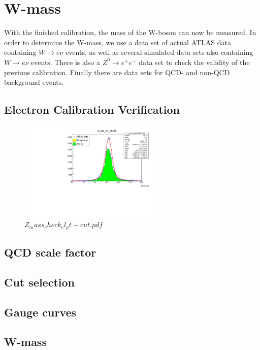 \section{W-mass}
\label{sec:w-mass}
With the finished calibration, the mass of the W-boson can now be measured. 
In order to determine the W-mass, we use a data set of actual ATLAS data containing $W \rightarrow e\nu$ events,
as well as several simulated data sets also containing $W \rightarrow e\nu$ events. 
There is also a $Z^0 \rightarrow e^+e^-$ data set to check the validity of the previous calibration. Finally there are data sets for QCD- and non-QCD background events.

\subsection{Electron Calibration Verification}

\begin{figure}[H]
    \centering
    \includegraphics[width=0.6\textwidth]{../W_mass/Z_mass_check_el_pt-cut.pdf}
    \caption{$Z_mass_check_el_pt-cut.pdf$}
    \label{fig:z-mass_check}
\end{figure}
\subsection{QCD scale factor}

\subsection{Cut selection}

\subsection{Gauge curves}

\subsection{W-mass }